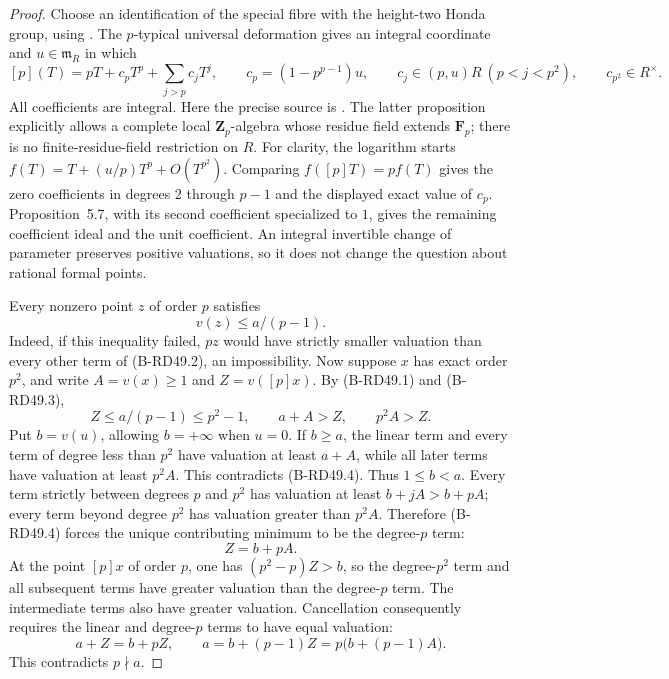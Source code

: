 \begin{proof}
Choose an identification of the special fibre with the height-two
Honda group, using \cite[Theorem~IV, pp.270--271]{Lazard1955Formal}.
The $p$-typical universal deformation gives an integral coordinate
and $u\in\mathfrak m_R$ in which
\[
 [p](T)=pT+c_pT^p+\sum_{j>p}c_jT^j,\qquad
 c_p=(1-p^{p-1})u,\qquad
 c_j\in(p,u)R\ (p<j<p^2),\qquad c_{p^2}\in R^\times.
                                                        \tag{B-RD49.2}
\]
All coefficients are integral. Here the precise source is
\cite[Proposition~5.7 and its displayed congruence; equations
(12.3)--(12.5) and Proposition~12.10 with proof]{HopkinsGross1994Bundles}.
The latter proposition explicitly allows a complete local
$\mathbf Z_p$-algebra whose residue field extends $\mathbf F_p$;
there is no finite-residue-field restriction on $R$.
For clarity, the logarithm starts
$f(T)=T+(u/p)T^p+O(T^{p^2})$. Comparing
$f([p]T)=pf(T)$ gives the zero coefficients in degrees $2$ through
$p-1$ and the displayed exact value of $c_p$.
Proposition~5.7, with its second coefficient specialized to $1$,
gives the remaining coefficient ideal and the unit coefficient.
An integral invertible change of parameter preserves positive
valuations, so it does not change the question about rational
formal points.

Every nonzero point $z$ of order $p$ satisfies
\[
                           v(z)\leq a/(p-1).            \tag{B-RD49.3}
\]
Indeed, if this inequality failed, $pz$ would have strictly smaller
valuation than every other term of (B-RD49.2), an impossibility.
Now suppose $x$ has exact order $p^2$, and write
$A=v(x)\geq1$ and $Z=v([p]x)$. By (B-RD49.1) and (B-RD49.3),
\[
              Z\leq a/(p-1)\leq p^2-1,
              \qquad a+A>Z,\qquad p^2A>Z.             \tag{B-RD49.4}
\]
Put $b=v(u)$, allowing $b=+\infty$ when $u=0$.
If $b\geq a$, the linear term and every term of degree less than
$p^2$ have valuation at least $a+A$, while all later terms have
valuation at least $p^2A$. This contradicts (B-RD49.4).
Thus $1\leq b<a$. Every term strictly between degrees $p$ and
$p^2$ has valuation at least $b+jA>b+pA$; every term beyond degree
$p^2$ has valuation greater than $p^2A$. Therefore (B-RD49.4)
forces the unique contributing minimum to be the degree-$p$ term:
\[
                              Z=b+pA.                  \tag{B-RD49.5}
\]
At the point $[p]x$ of order $p$, one has
$(p^2-p)Z>b$, so the degree-$p^2$ term and all subsequent terms
have greater valuation than the degree-$p$ term. The intermediate
terms also have greater valuation. Cancellation consequently
requires the linear and degree-$p$ terms to have equal valuation:
\[
            a+Z=b+pZ,\qquad
            a=b+(p-1)Z=p\bigl(b+(p-1)A\bigr).
                                                        \tag{B-RD49.6}
\]
This contradicts $p\nmid a$.
\end{proof}

